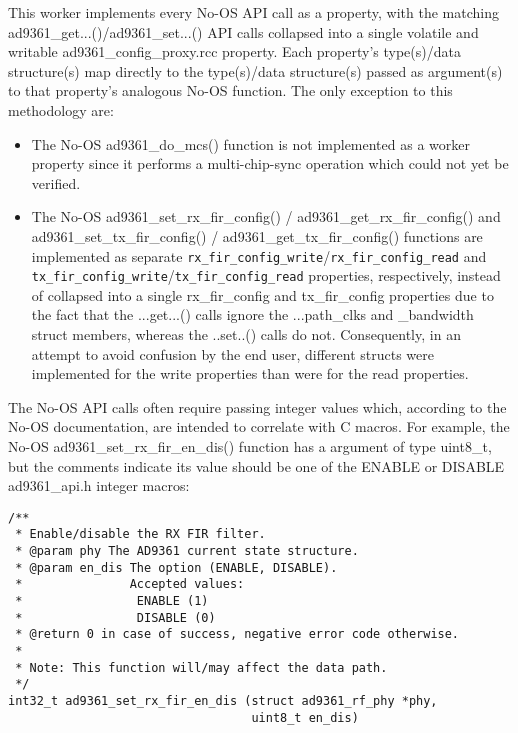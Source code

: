 \documentclass{article}
\def\comp{ad9361\_config\_proxy}
\begin{document}
\noindent \begin{sloppypar}
\noindent This worker implements every No-OS API call as a property, with the matching ad9361\_get...()/ad9361\_set...() API calls collapsed into a single volatile and writable \comp{}.rcc property. Each property's type(s)/data structure(s) map directly to the type(s)/data structure(s) passed as argument(s) to that property's analogous No-OS function. The only exception to this methodology are:
\begin{itemize}
	\item The No-OS ad9361\_do\_mcs() function is not implemented as a worker property since it performs a multi-chip-sync operation which could not yet be verified.
	\item The No-OS ad9361\_set\_rx\_fir\_config() / ad9361\_get\_rx\_fir\_config() and ad9361\_set\_tx\_fir\_config() / ad9361\_get\_tx\_fir\_config() functions are implemented as separate \verb+rx_fir_config_write+/\verb+rx_fir_config_read+ and \verb+tx_fir_config_write+/\verb+tx_fir_config_read+ properties, respectively, instead of collapsed into a single rx\_fir\_config and tx\_fir\_config properties due to the fact that the ...get...() calls ignore the ...path\_clks and \_bandwidth struct members, whereas the ..set..() calls do not. Consequently, in an attempt to avoid confusion by the end user, different structs were implemented for the write properties than were for the read properties.
\end{itemize}
\end{sloppypar}
\noindent
The No-OS API calls often require passing integer values which, according to the No-OS documentation, are intended to correlate with C macros. For example, the No-OS ad9361\_set\_rx\_fir\_en\_dis() function has a argument of type uint8\_t, but the comments indicate its value should be one of the ENABLE or DISABLE ad9361\_api.h integer macros:\pagebreak
\begin{lstlisting}
/**
 * Enable/disable the RX FIR filter.
 * @param phy The AD9361 current state structure.
 * @param en_dis The option (ENABLE, DISABLE).
 *               Accepted values:
 *                ENABLE (1)
 *                DISABLE (0)
 * @return 0 in case of success, negative error code otherwise.
 *
 * Note: This function will/may affect the data path.
 */
int32_t ad9361_set_rx_fir_en_dis (struct ad9361_rf_phy *phy,
                                  uint8_t en_dis)
\end{lstlisting}
\end{document}
